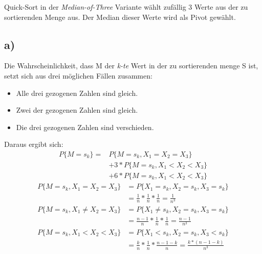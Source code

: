 \documentclass[11pt,a4paper]{article}
\begin{document}
    Quick-Sort in der \textit{Median-of-Three} Variante wählt zufällig 3 Werte aus der zu sortierenden Menge aus. Der Median dieser Werte wird als Pivot gewählt.\\

    \subsection*{a)}

      Die Wahrscheinlichkeit, dass M der \textit{k-te} Wert in der zu sortierenden menge S ist, setzt sich aus drei möglichen Fällen zusammen:
      \begin{itemize}
      	\item Alle drei gezogenen Zahlen sind gleich.
      	\item Zwei der gezogenen Zahlen sind gleich.
      	\item Die drei gezogenen Zahlen sind verschieden.
      \end{itemize}
      Daraus ergibt sich:
      \begin{equation} \label{eq1}
      	\begin{split}
      	  P\{ M=s_k \} = & P\{ M=s_k , X_1 =X_2 =X_3 \} \\
      	  & + 3*P\{ M=s_k , X_1 < X_2 < X_3 \}\\
      	  & + 6*P\{ M=s_k , X_1 < X_2 < X_3 \}
      	  \end{split}
      \end{equation}
      \begin{equation} \label{eq2}
        \begin{split}
          P\{ M=s_k , X_1 =X_2 =X_3 \} & = P\{X_1 =s_k , X_2 =s_k , X_3 =s_k \}\\
          & = \frac{1}{n} * \frac{1}{n} * \frac{1}{n} = \frac{1}{n^3}
        \end{split}
      \end{equation}
      \begin{equation} \label{eq3}
      	\begin{split}
      	  P\{ M=s_k , X_1 \neq X_2 =X_3 \} & = P\{X_1 \neq s_k , X_2 =s_k , X_3 =s_k \}\\
      	  & = \frac{n-1}{n} * \frac{1}{n} * \frac{1}{n} = \frac{n-1}{n^3}
      	\end{split}
      \end{equation}
      \begin{equation} \label{eq4}
      	\begin{split}
      	  P\{ M=s_k , X_1 < X_2 < X_3 \} & = P\{X_1 < s_k , X_2 =s_k , X_3 < s_k \}\\
      	  & = \frac{k}{n} * \frac{1}{n} * \frac{n-1-k}{n} = \frac{k*(n-1-k)}{n^3}
      	\end{split}
      \end{equation}
\end{document}

